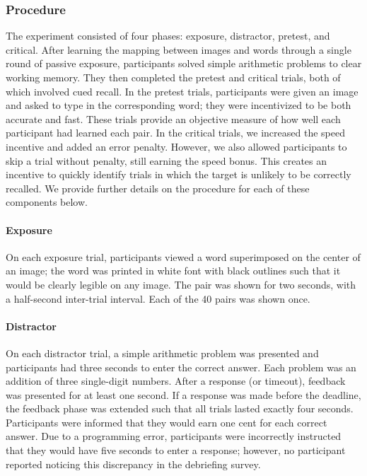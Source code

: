 \subsubsection{Procedure}

The experiment consisted of four phases: exposure, distractor, pretest, and critical. After learning the mapping between images and words through a single round of passive exposure, participants solved simple arithmetic problems to clear working memory. They then completed the pretest and critical trials, both of which involved cued recall. In the pretest trials, participants were given an image and asked to type in the corresponding word; they were incentivized to be both accurate and fast. These trials provide an objective measure of how well each participant had learned each pair. In the critical trials, we increased the speed incentive and added an error penalty. However, we also allowed participants to skip a trial without penalty, still earning the speed bonus. This creates an incentive to quickly identify trials in which the target is unlikely to be correctly recalled. We provide further details on the procedure for each of these components below.

\paragraph{Exposure} On each exposure trial, participants viewed a word superimposed on the center of an image; the word was printed in white font with black outlines such that it would be clearly legible on any image. The pair was shown for two seconds, with a half-second inter-trial interval. Each of the 40 pairs was shown once.

\paragraph{Distractor} On each distractor trial, a simple arithmetic problem was presented and participants had three seconds to enter the correct answer. Each problem was an addition of three single-digit numbers. After a response (or timeout), feedback was presented for at least one second. If a response was made before the deadline, the feedback phase was extended such that all trials lasted exactly four seconds. Participants were informed that they would earn one cent for each correct answer. Due to a programming error, participants were incorrectly instructed that they would have five seconds to enter a response; however, no participant reported noticing this discrepancy in the debriefing survey.

